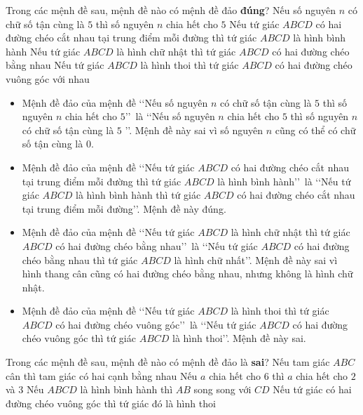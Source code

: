 \begin{ex}%
	Trong các mệnh đề sau, mệnh đề nào có mệnh đề đảo \textbf{đúng}?
	\choice
	{Nếu số nguyên $n$ có chữ số tận cùng là $5$ thì số nguyên $n$ chia hết cho $5$}
	{\True Nếu tứ giác $ABCD$ có hai đường chéo cắt nhau tại trung điểm mỗi đường thì tứ giác $ABCD$ là hình bình hành}
	{Nếu tứ giác $ABCD$ là hình chữ nhật thì tứ giác $ABCD$ có hai đường chéo bằng nhau}
	{Nếu tứ giác $ABCD$ là hình thoi thì tứ giác $ABCD$ có hai đường chéo vuông góc với nhau}
	\loigiai
	{
		\begin{itemize}
			\item Mệnh đề đảo của mệnh đề \lq\lq  Nếu số nguyên $n$ có chữ số tận cùng là $5$ thì số nguyên $n$ chia hết cho $5$\rq\rq\, là \lq\lq  Nếu số nguyên $n$ chia hết cho $5$ thì số nguyên $n$ có chữ số tận cùng là $5$ \rq\rq. Mệnh đề này sai vì số nguyên $n$ cũng có thể có chữ số tận cùng là $0$.
			\item Mệnh đề đảo của mệnh đề \lq\lq  Nếu tứ giác $ABCD$ có hai đường chéo cắt nhau tại trung điểm mỗi đường thì tứ giác $ABCD$ là hình bình hành\rq\rq\, là \lq\lq  Nếu tứ giác $ABCD$ là hình bình hành thì tứ giác $ABCD$ có hai đường chéo cắt nhau tại trung điểm mỗi đường\rq\rq. Mệnh đề này đúng.
			\item Mệnh đề đảo của mệnh đề \lq\lq  Nếu tứ giác $ABCD$ là hình chữ nhật thì tứ giác $ABCD$ có hai đường chéo bằng nhau\rq\rq\, là \lq\lq  Nếu tứ giác $ABCD$ có hai đường chéo bằng nhau thì tứ giác $ABCD$ là hình chữ nhất\rq\rq. Mệnh đề này sai vì hình thang cân cũng có hai đường chéo bằng nhau, nhưng không là hình chữ nhật.
			\item Mệnh đề đảo của mệnh đề \lq\lq  Nếu tứ giác $ABCD$ là hình thoi thì tứ giác $ABCD$ có hai đường chéo vuông góc\rq\rq\, là \lq\lq  Nếu tứ giác $ABCD$ có hai đường chéo vuông góc thì tứ giác $ABCD$ là hình thoi\rq\rq. Mệnh đề này sai.
		\end{itemize}
	}
\end{ex}
\begin{ex}%
	Trong các mệnh đề sau, mệnh đề nào có mệnh đề đảo là \textbf{sai}?
	\choice
	{Nếu tam giác $ABC$ cân thì tam giác có hai cạnh bằng nhau}
	{Nếu $ a$ chia hết cho $6$ thì $ a$ chia hết cho $2$ và $3$}
	{\True Nếu $ABCD$ là hình bình hành thì $AB$ song song với $CD$}
	{Nếu tứ giác có hai đường chéo vuông góc thì tứ giác đó là hình thoi}
\end{ex}
